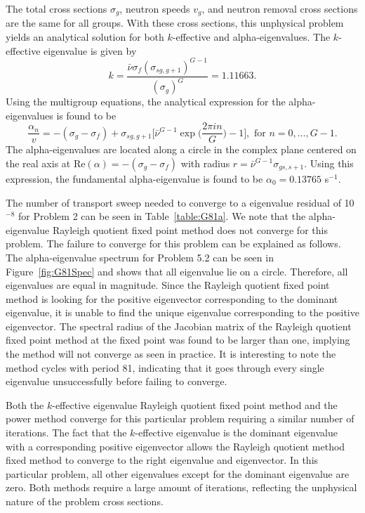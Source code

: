 The total cross sections $\sigma_{g}$, neutron speeds $v_{g}$, and neutron removal cross sections are the same for all groups. With these cross sections, this unphysical problem yields an analytical solution for both $k$-effective and alpha-eigenvalues. The $k$-effective eigenvalue is given by
\begin{equation}
	k = \frac{\bar{\nu} \sigma_{f} (\sigma_{sg,g+1})^{G-1}}{(\sigma_{g})^{G}} = 1.11663.
\end{equation}
Using the multigroup equations, the analytical expression for the alpha-eigenvalues is found to be
\begin{equation}
\frac{\alpha_{n}}{v} = -(\sigma_{g} - \sigma_{f}) + \sigma_{sg,g+1} \bigg [ \bar{\nu}^{G-1} \exp \bigg ( \frac{2 \pi i n}{G} \bigg ) - 1 \bigg ], \text{ for } n = 0, \dots, G-1. 
\end{equation}
The alpha-eigenvalues are located along a circle in the complex plane centered on the real axis at $\text{Re}(\alpha) = -(\sigma_{g} - \sigma_{f})$ with radius $r = \bar{\nu}^{G-1} \sigma_{gs,s+1}$. Using this expression, the fundamental alpha-eigenvalue is found to be $\alpha_{0} = 0.13765$ s$^{-1}$. 

The number of transport sweep needed to converge to a eigenvalue residual of 10$^{-8}$ for Problem 2 can be seen in Table~\ref{table:G81a}. We note that the alpha-eigenvalue Rayleigh quotient fixed point method does not converge for this problem. The failure to converge for this problem can be explained as follows. The alpha-eigenvalue spectrum for Problem 5.2 can be seen in Figure~\ref{fig:G81Spec} and shows that all eigenvalue lie on a circle. Therefore, all eigenvalues are equal in magnitude. Since the Rayleigh quotient fixed point method is looking for the positive eigenvector corresponding to the dominant eigenvalue, it is unable to find the unique eigenvalue corresponding to the positive eigenvector. The spectral radius of the Jacobian matrix of the Rayleigh quotient fixed point method at the fixed point was found to be larger than one, implying the method will not converge as seen in practice. It is interesting to note the method cycles with period 81, indicating that it goes through every single eigenvalue unsuccessfully before failing to converge.

Both the $k$-effective eigenvalue Rayleigh quotient fixed point method and the power method converge for this particular problem requiring a similar number of iterations. The fact that the $k$-effective eigenvalue is the dominant eigenvalue with a corresponding positive eigenvector allows the Rayleigh quotient method fixed method to converge to the right eigenvalue and eigenvector. In this particular problem, all other eigenvalues except for the dominant eigenvalue are zero. Both methods require a large amount of iterations, reflecting the unphysical nature of the problem cross sections. 

